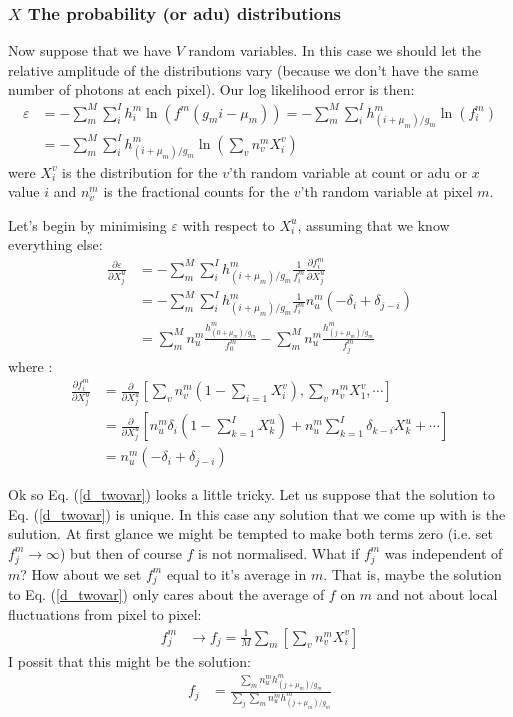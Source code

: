\documentclass[11pt]{article}
\begin{document}
\subsubsection{$X$ The probability (or adu) distributions}
Now suppose that we have $V$ random variables. In this case we should let the relative amplitude of the distributions vary (because we don't have the same number of photons at each pixel). Our log likelihood error is then:
\begin{align}
   \varepsilon &= -\sum_m^M \sum_i^I h^m_i \ln(f^m(g_mi - \mu_m)) = -\sum_m^M \sum_i^I h^m_{(i+\mu_m)/g_m} \ln(f^m_i) \\
   &= -\sum_m^M \sum_i^I h^m_{(i+\mu_m)/g_m} \ln\left(\sum_v n^m_v X^v_i\right)
\end{align}
were $X^v_i$ is the distribution for the $v$'th random variable at count or adu or $x$ value $i$ and $n^m_v$ is the fractional counts for the $v$'th random variable at pixel $m$. 

Let's begin by minimising $\varepsilon$ with respect to $X^u_i$, assuming that we know everything else:
\begin{align}
   \frac{\partial \varepsilon}{\partial X^u_j} &= -\sum_m^M \sum_i^I h^m_{(i+\mu_m)/g_m} \frac{1}{f^m_i} \frac{\partial f^m_i}{\partial X^u_j} \\
   &= - \sum_m^M \sum_i^I h^m_{(i+\mu_m)/g_m} \frac{1}{f^m_i}n^m_u(-\delta_{i} + \delta_{j-i}) \\
   &=  \sum_m^M n^m_u \frac{ h^m_{(0+\mu_m)/g_m}}{f^m_0}- \sum_m^M n^m_u \frac{ h^m_{(j+\mu_m)/g_m}}{f^m_j} 
   \label{d_twovar}
\end{align}
where :
\begin{align}
   \frac{\partial f^m_i}{\partial X^u_j} &= \frac{\partial }{\partial X^u_j} \left[ \sum_v n^m_v (1- \sum_{i=1} X^v_i), \sum_v n^m_v X^v_1, \cdots \right]\\
   &= \frac{\partial }{\partial X^u_j} \left[ n^m_u \delta_{i} (1 - \sum_{k=1}^I X^u_k) + n^m_u\sum_{k=1}^I \delta_{k-i} X^u_k + \cdots \right] \\
   &= n^m_u(-\delta_{i} + \delta_{j-i}) 
\end{align}

Ok so Eq. (\ref{d_twovar}) looks a little tricky. Let us suppose that the solution to Eq. (\ref{d_twovar}) is unique. In this case any solution that we come up with is the sulution. At first glance we might be tempted to make both terms zero (i.e. set $f^m_j \rightarrow \infty$) but then of course $f$ is not normalised. What if $f^m_j$ was independent of $m$? How about we set $f^m_j$ equal to it's average in $m$. That is, maybe the solution to Eq. (\ref{d_twovar}) only cares about the average of $f$ on $m$ and not about local fluctuations from pixel to pixel:
\begin{align}
   f^m_j &\rightarrow f_j = \frac{1}{M}\sum_m \left[ \sum_v n^m_v X^v_i \right] 
\end{align}
I possit that this might be the solution:
\begin{align}
   f_j &= \frac{\sum_m n^m_u h^m_{(j+\mu_m)/g_m}}{\sum_{j}\sum_m n^m_u h^m_{(j+\mu_m)/g_m}}
\end{align}
\end{document}
